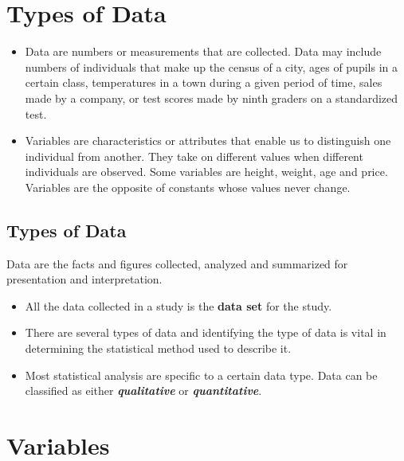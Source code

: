 \documentclass[a4paper,12pt]{article}
\begin{document}
\section{Types of Data}
\begin{itemize}
\item Data are numbers or measurements that are collected. Data may include numbers of individuals that make up the census of a city, ages of pupils in a certain class, temperatures in a town during a given period of time, sales made by a company, or test scores made by ninth graders on a standardized test.
\item 
Variables are characteristics or attributes that enable us to distinguish one individual from another. They take on different values when different individuals are observed. Some variables are height, weight, age and price. Variables are the opposite of constants whose values never change.
\end{itemize}
\subsection{Types of Data}


Data are the facts and figures collected, analyzed and
summarized for presentation and interpretation.

\begin{itemize}
	\item All the data collected in a study is the \textbf{data set} for the study.
	\item There are several types of data and identifying the type of
	data is vital in determining the statistical method used to
	describe it.
	\item Most statistical analysis are specific to a certain data type. Data can be classified as either \textit{\textbf{qualitative}} or \textit{\textbf{quantitative}}.
\end{itemize}


\section{Variables}
\end{document}
